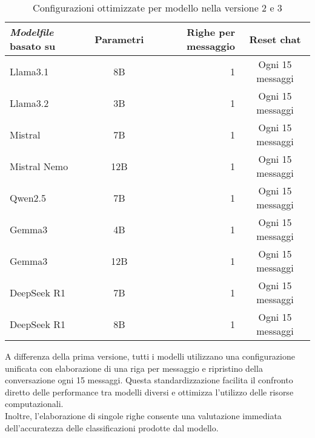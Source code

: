 \documentclass[12pt]{report}
\begin{document}
\begin{table}[h!]
    \centering
    \begin{tabular}{|l|c|r|c|}
        \hline
        \textbf{\textit{Modelfile} basato su} & \textbf{Parametri} & \textbf{Righe per messaggio} & \textbf{Reset chat} \\ \hline
        Llama3.1                              & 8B                 & 1                            & Ogni 15 messaggi    \\ \hline
        Llama3.2                              & 3B                 & 1                            & Ogni 15 messaggi    \\ \hline
        Mistral                               & 7B                 & 1                            & Ogni 15 messaggi    \\ \hline
        Mistral Nemo                          & 12B                & 1                            & Ogni 15 messaggi    \\ \hline
        Qwen2.5                               & 7B                 & 1                            & Ogni 15 messaggi    \\ \hline
        Gemma3                                & 4B                 & 1                            & Ogni 15 messaggi    \\ \hline
        Gemma3                                & 12B                & 1                            & Ogni 15 messaggi    \\ \hline
        DeepSeek R1                           & 7B                 & 1                            & Ogni 15 messaggi    \\ \hline
        DeepSeek R1                           & 8B                 & 1                            & Ogni 15 messaggi    \\ \hline
    \end{tabular}
    \caption{Configurazioni ottimizzate per modello nella versione 2 e 3}
    \label{tab:modelli_llm_ver2}
\end{table}

A differenza della prima versione, tutti i modelli utilizzano una configurazione unificata con elaborazione di una riga per messaggio e ripristino della conversazione ogni 15 messaggi. Questa standardizzazione facilita il confronto diretto delle performance tra modelli diversi e ottimizza l'utilizzo delle risorse computazionali. \\
Inoltre, l'elaborazione di singole righe consente una valutazione immediata dell'accuratezza delle classificazioni prodotte dal modello.
\end{document}
